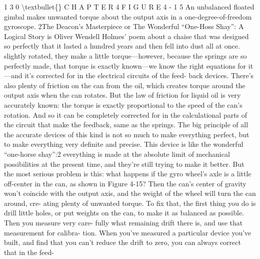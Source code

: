 \documentclass[10pt,oneside]{article}
\begin{document}
1 3 0 \textbackslash{}textbullet\{\} C H A P T E R  4 F I G U R E  4 - 1 5 An unbalanced floated gimbal makes unwanted torque about the output axis in a one-degree-of-freedom gyroscope. 2The Deacon’s Masterpiece or The Wonderful “One-Hoss Shay”: A Logical Story is Oliver Wendell Holmes’ poem about a chaise that was designed so perfectly that it lasted a hundred years and then fell into dust all at once. slightly rotated, they make a little torque---however, because the springs are so perfectly made, that torque is exactly known---we know the right equations for it---and it’s corrected for in the electrical circuits of the feed- back devices. There’s also plenty of friction on the can from the oil, which creates torque around the output axis when the can rotates. But the law of friction for liquid oil is very accurately known: the torque is exactly proportional to the speed of the can’s rotation. And so it can be completely corrected for in the calculational parts of the circuit that make the feedback, same as the springs. The big principle of all the accurate devices of this kind is not so much to make everything perfect, but to make everything very definite and precise. This device is like the wonderful “one-horse shay”:2 everything is made at the absolute limit of mechanical possibilities at the present time, and they’re still trying to make it better. But the most serious problem is this: what happens if the gyro wheel’s axle is a little off-center in the can, as shown in Figure 4-15? Then the can’s center of gravity won’t coincide with the output axis, and the weight of the wheel will turn the can around, cre- ating plenty of unwanted torque. To fix that, the first thing you do is drill little holes, or put weights on the can, to make it as balanced as possible. Then you measure very care- fully what remaining drift there is, and use that measurement for calibra- tion. When you’ve measured a particular device you’ve built, and find that you can’t reduce the drift to zero, you can always correct that in the feed-\par
\end{document}

